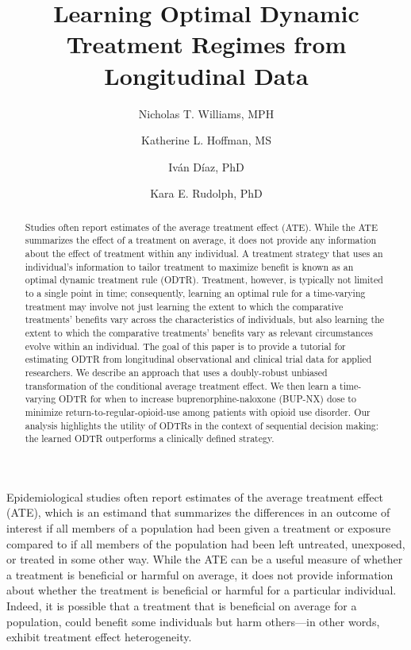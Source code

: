 \documentclass[11pt]{article}
\title{Learning Optimal Dynamic Treatment Regimes from Longitudinal Data}
\author[1]{Nicholas T. Williams, MPH}
\author[1]{Katherine L. Hoffman, MS}
\author[2]{Iv\'an D\'iaz, PhD}
\author[1]{Kara E. Rudolph, PhD}
\affil[1]{\footnotesize Department of Epidemiology, Mailman School of Public Health, Columbia University, New York, New York}
\affil[2]{\footnotesize Division of Biostatistics, Department of Population
  Health Sciences, New York University Grossman School of Medicine, New York, New York}
\author{}
\date{}
\theoremstyle{example}
\begin{document}
 

\maketitle

\begin{abstract}
Studies often report estimates of the average treatment effect (ATE). While the ATE summarizes the effect of a treatment on average, it does not provide any information about the effect of treatment within any individual. A treatment strategy that uses an individual’s information to tailor treatment to maximize benefit is known as an optimal dynamic treatment rule (ODTR). Treatment, however, is typically not limited to a single point in time; consequently, learning an optimal rule for a time-varying treatment may involve not just learning the extent to which the comparative treatments’ benefits vary across the characteristics of individuals, but also learning the extent to which the comparative treatments’ benefits vary as relevant circumstances evolve within an individual. The goal of this paper is to provide a tutorial for estimating ODTR from longitudinal observational and clinical trial data for applied researchers. We describe an approach that uses a doubly-robust unbiased transformation of the conditional average treatment effect. We then learn a time-varying ODTR for when to increase buprenorphine-naloxone (BUP-NX) dose to minimize return-to-regular-opioid-use among patients with opioid use disorder. Our analysis highlights the utility of ODTRs in the context of sequential decision making: the learned ODTR outperforms a clinically defined strategy.


\end{abstract}
\newpage
Epidemiological studies often report estimates of the average treatment effect (ATE), which is an estimand that summarizes the differences in an outcome of interest if all members of a population had been given a treatment or exposure compared to if all members of the population had been left untreated, unexposed, or treated in some other way. While the ATE can be a useful measure of whether a treatment is beneficial or harmful on average, it does not provide information about whether the treatment is beneficial or harmful for a particular individual. Indeed, it is possible that a treatment that is beneficial on average for a population, could benefit some individuals but harm others---in other words, exhibit treatment effect heterogeneity. 
\end{document}
